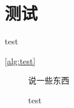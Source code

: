 \documentclass{../gdutthesis}
\begin{document}
\mainmatter

\chapter{测试}{test}

\autoref{alg:test}

\begin{figure}  %
\begin{minipage}{1.0\linewidth}
\begin{algorithm}[H]
  \caption{test}\label{alg:test}
  \begin{algorithmic}[1]
  \STATE 说一些东西
  \end{algorithmic}
\end{algorithm}
\end{minipage}
\end{figure}
\end{document}
